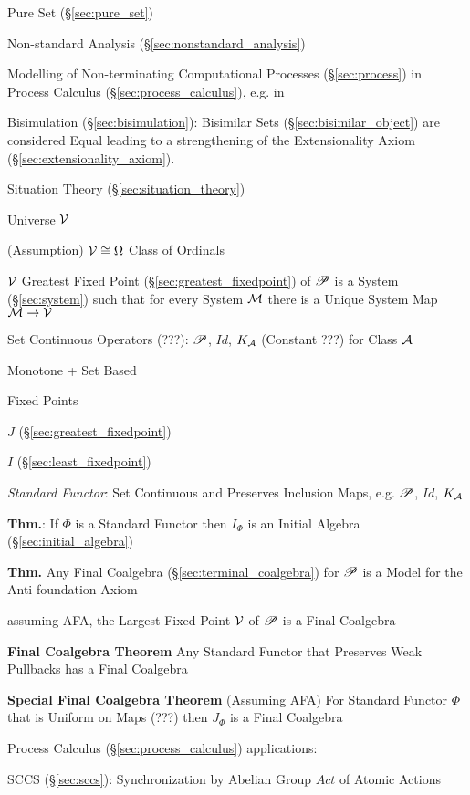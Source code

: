 Pure Set (\S\ref{sec:pure_set})

Non-standard Analysis (\S\ref{sec:nonstandard_analysis})

Modelling of Non-terminating Computational Processes
(\S\ref{sec:process}) in Process Calculus
(\S\ref{sec:process_calculus}), e.g. in
\cite{abramsky-gay-nagarajan96}

Bisimulation (\S\ref{sec:bisimulation}): Bisimilar Sets
(\S\ref{sec:bisimilar_object}) are considered Equal leading to a
strengthening of the Extensionality Axiom
(\S\ref{sec:extensionality_axiom}).

Situation Theory (\S\ref{sec:situation_theory})

Universe $\mathcal{V}$

(Assumption) $\mathcal{V} \cong \Omega$ Class of Ordinals

$\mathcal{V}$ Greatest Fixed Point (\S\ref{sec:greatest_fixedpoint}) of
$\mathscr{P}$ is a System (\S\ref{sec:system}) such that for every System
$\mathcal{M}$ there is a Unique System Map $\mathcal{M} \to
\mathcal{V}$

Set Continuous Operators (???): $\mathscr{P}$, $Id$, $K_\mathcal{A}$ (Constant
???) for Class $\mathcal{A}$

Monotone + Set Based

Fixed Points

$J$ (\S\ref{sec:greatest_fixedpoint})

$I$ (\S\ref{sec:least_fixedpoint})

\emph{Standard Functor}: Set Continuous and Preserves Inclusion Maps,
e.g. $\mathscr{P}$, $Id$, $K_\mathcal{A}$

\textbf{Thm.}: If $\Phi$ is a Standard Functor then $I_\Phi$ is an
Initial Algebra (\S\ref{sec:initial_algebra})

\textbf{Thm.} Any Final Coalgebra (\S\ref{sec:terminal_coalgebra}) for
$\mathscr{P}$ is a Model for the Anti-foundation Axiom

assuming AFA, the Largest Fixed Point $\mathcal{V}$ of $\mathscr{P}$ is a Final
Coalgebra

\textbf{Final Coalgebra Theorem} Any Standard Functor that Preserves
Weak Pullbacks has a Final Coalgebra

\textbf{Special Final Coalgebra Theorem} (Assuming AFA) For Standard
Functor $\Phi$ that is Uniform on Maps (???) then $J_\Phi$ is a Final
Coalgebra

Process Calculus (\S\ref{sec:process_calculus}) applications:

SCCS (\S\ref{sec:sccs}): Synchronization by Abelian Group $Act$ of
Atomic Actions

